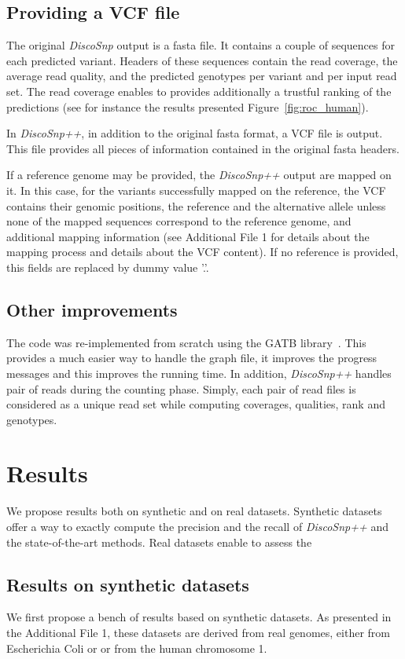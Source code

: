 \documentclass{bmcart}
\newcommand{\disco}{{\it DiscoSnp}\xspace}
\newcommand{\discopp}{{\it DiscoSnp++}\xspace}
\begin{document}
\subsection*{Providing a VCF file}
The original \disco output is a fasta file. It contains a couple of sequences for each predicted variant. Headers of these sequences contain the read coverage, the average read quality, and the predicted genotypes per variant and per input read set. The read coverage enables to provides additionally a trustful ranking of the predictions (see for instance the results presented Figure~\ref{fig:roc_human}).

In \discopp, in addition to the original fasta format, a VCF file is output. This file provides all pieces of information contained in the original fasta headers.

If a reference genome may be provided, the \discopp output are mapped on it. In this case, for the variants successfully mapped on the reference, the VCF contains their genomic positions, the reference and the alternative allele unless none of the mapped sequences correspond to the reference genome, and additional mapping information (see Additional File 1 for details about the mapping process and details about the VCF content). 
If no reference is provided, this fields are replaced by dummy value '.'.

\subsection*{Other improvements}
The code was re-implemented from scratch using the GATB library~\cite{Drezen2014}. This provides a much easier way to handle the graph file, it improves the progress messages and this improves the running time. In addition, \discopp handles pair of reads during the counting phase. Simply, each pair of read files is considered as a unique read set while computing coverages, qualities, rank and genotypes. 

\section*{Results}
We propose results both on synthetic and on real datasets. Synthetic datasets offer a way to exactly compute the precision and the recall of \discopp and the state-of-the-art methods. Real datasets enable to assess the 

\subsection*{Results on synthetic datasets}
We first propose a bench of results based on synthetic datasets. As presented in the Additional File 1, these datasets are derived from real genomes, either from Escherichia Coli or or from the human chromosome 1. 
\end{document}
